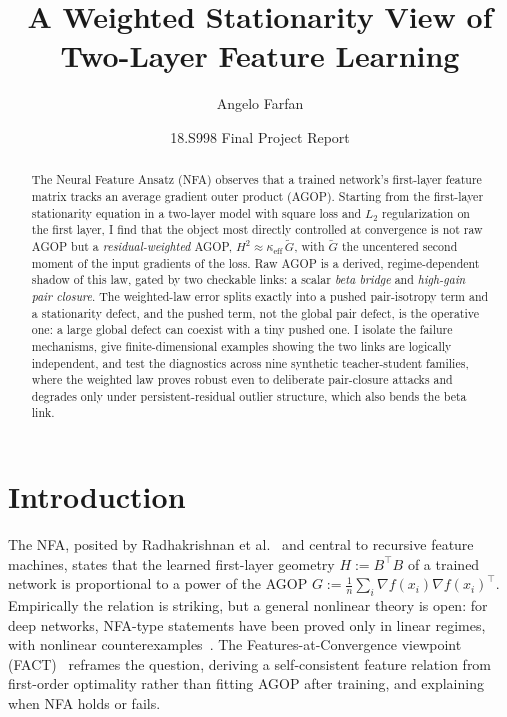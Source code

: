 \documentclass[10pt]{article}
\title{A Weighted Stationarity View of Two-Layer Feature Learning}
\author{Angelo Farfan}
\date{\vspace{-1.0em}\small 18.S998 Final Project Report\vspace{-1.4em}}
\newcommand{\T}{^{\!\top}}
\newcommand{\eff}{\mathrm{eff}}
\newcommand{\Gw}{\widetilde{G}}
\begin{document}
\maketitle

\begin{abstract}\noindent\small
The Neural Feature Ansatz (NFA) observes that a trained network's first-layer feature matrix tracks an average gradient outer product (AGOP). Starting from the first-layer stationarity equation in a two-layer model with square loss and $L_2$ regularization on the first layer, I find that the object most directly controlled at convergence is not raw AGOP but a \emph{residual-weighted} AGOP, $H^2 \approx \kappa_{\eff}\,\Gw$, with $\Gw$ the uncentered second moment of the input gradients of the loss. Raw AGOP is a derived, regime-dependent shadow of this law, gated by two checkable links: a scalar \emph{beta bridge} and \emph{high-gain pair closure}. The weighted-law error splits exactly into a pushed pair-isotropy term and a stationarity defect, and the pushed term, not the global pair defect, is the operative one: a large global defect can coexist with a tiny pushed one. I isolate the failure mechanisms, give finite-dimensional examples showing the two links are logically independent, and test the diagnostics across nine synthetic teacher-student families, where the weighted law proves robust even to deliberate pair-closure attacks and degrades only under persistent-residual outlier structure, which also bends the beta link.
\end{abstract}

\section{Introduction}

The NFA, posited by Radhakrishnan et al.~\cite{radhakrishnan2024mechanism} and central to recursive feature machines, states that the learned first-layer geometry $H := B\T B$ of a trained network is proportional to a power of the AGOP $G := \tfrac{1}{n}\sum_i \nabla f(x_i)\nabla f(x_i)\T$. Empirically the relation is striking, but a general nonlinear theory is open: for deep networks, NFA-type statements have been proved only in linear regimes, with nonlinear counterexamples~\cite{tansley2025nfa}. The Features-at-Convergence viewpoint (FACT)~\cite{boixadsera2025fact} reframes the question, deriving a self-consistent feature relation from first-order optimality rather than fitting AGOP after training, and explaining when NFA holds or fails.
\end{document}
